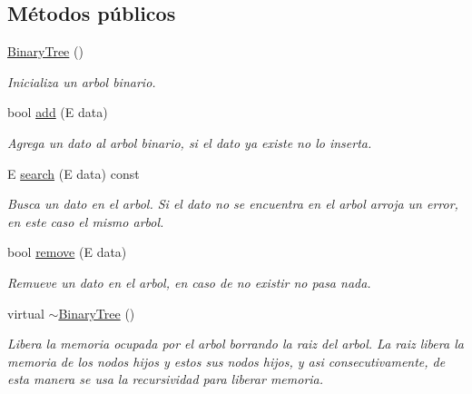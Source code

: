 \subsection*{Métodos públicos}
\begin{DoxyCompactItemize}
\item 
\hypertarget{classBinaryTree_ae3d78b752a8a3c48ba2f6d3e51eefc6f}{\hyperlink{classBinaryTree_ae3d78b752a8a3c48ba2f6d3e51eefc6f}{Binary\-Tree} ()}\label{classBinaryTree_ae3d78b752a8a3c48ba2f6d3e51eefc6f}

\begin{DoxyCompactList}\small\item\em Inicializa un arbol binario. \end{DoxyCompactList}\item 
bool \hyperlink{classBinaryTree_a68affc88c790c15456f29e5d33f29198}{add} (E data)
\begin{DoxyCompactList}\small\item\em Agrega un dato al arbol binario, si el dato ya existe no lo inserta. \end{DoxyCompactList}\item 
E \hyperlink{classBinaryTree_acfd3b1f3d4944c900c35ce53bfd0d428}{search} (E data) const 
\begin{DoxyCompactList}\small\item\em Busca un dato en el arbol. Si el dato no se encuentra en el arbol arroja un error, en este caso el mismo arbol. \end{DoxyCompactList}\item 
bool \hyperlink{classBinaryTree_aa4093a8ea3e85b9064e6264a0b40c342}{remove} (E data)
\begin{DoxyCompactList}\small\item\em Remueve un dato en el arbol, en caso de no existir no pasa nada. \end{DoxyCompactList}\item 
\hypertarget{classBinaryTree_a484cf26b3a984cef9978de0c0d638874}{virtual \hyperlink{classBinaryTree_a484cf26b3a984cef9978de0c0d638874}{$\sim$\-Binary\-Tree} ()}\label{classBinaryTree_a484cf26b3a984cef9978de0c0d638874}

\begin{DoxyCompactList}\small\item\em Libera la memoria ocupada por el arbol borrando la raiz del arbol. La raiz libera la memoria de los nodos hijos y estos sus nodos hijos, y asi consecutivamente, de esta manera se usa la recursividad para liberar memoria. \end{DoxyCompactList}\end{DoxyCompactItemize}


